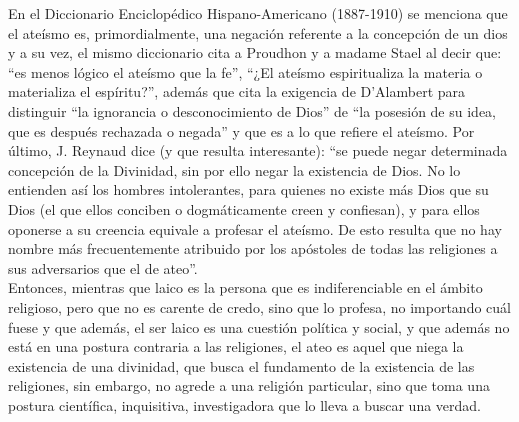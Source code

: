 \documentclass[12pt]{book} %
\begin{document}
En el Diccionario Enciclopédico Hispano-Americano (1887-1910) se menciona que el ateísmo es, primordialmente, una negación referente a la concepción de un dios y a su vez, el mismo diccionario cita a Proudhon y a madame Stael al decir que: ``es menos lógico el ateísmo que la fe'', ``¿El ateísmo espiritualiza la materia o materializa el espíritu?'', además que cita la exigencia de D'Alambert para distinguir ``la ignorancia o desconocimiento de Dios'' de ``la posesión de su idea, que es después rechazada o negada'' y que es a lo que refiere el ateísmo. Por último, J. Reynaud dice (y que resulta interesante): ``se puede negar determinada concepción de la Divinidad, sin por ello negar la existencia de Dios. No lo entienden así los hombres intolerantes, para quienes no existe más Dios que su Dios (el que ellos conciben o dogmáticamente creen y confiesan), y para ellos oponerse a su creencia equivale a profesar el ateísmo. De esto resulta que no hay nombre más frecuentemente atribuido por los apóstoles de todas las religiones a sus adversarios que el de ateo''.\\

Entonces, mientras que laico es la persona que es indiferenciable en el ámbito religioso, pero que no es carente de credo, sino que lo profesa, no importando cuál fuese y que además, el ser laico es una cuestión política y social, y que además no está en una postura contraria a las religiones, el ateo es aquel que niega la existencia de una divinidad, que busca el fundamento de la existencia de las religiones, sin embargo, no agrede a una religión particular, sino que toma una postura científica, inquisitiva, investigadora que lo lleva a buscar una verdad.
\end{document}
